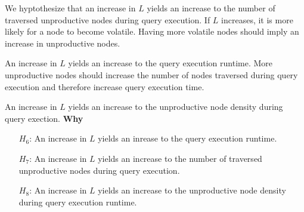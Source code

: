 \documentclass[abstracton,12pt]{scrartcl}
\theoremstyle{definition}
\begin{document}
We hyptothesize that an increase in $L$ yields an increase to the number of
traversed unproductive nodes during query execution. If $L$ increases, it is
more likely for a node to become volatile. Having more volatile nodes should
imply an increase in unproductive nodes.

An increase in $L$ yields an increase to the query execution runtime. More
unproductive nodes should increase the number of nodes traversed
during query execution and therefore increase query execution time.

An increase in $L$ yields an increase to the unproductive node density during
query exection. \textbf{Why}

\begin{shaded}
  \begin{itemize}
  \item[$H_6$:] An increase in $L$ yields an inrease to the query execution runtime. 
  \item[$H_7$:] An increase in $L$ yields an increase to the number of
    traversed unproductive nodes during query execution.
  \item[$H_8$:] An increase in $L$ yields an increase to the unproductive node
    density during query execution runtime.
  \end{itemize}
\end{shaded}
\end{document}
